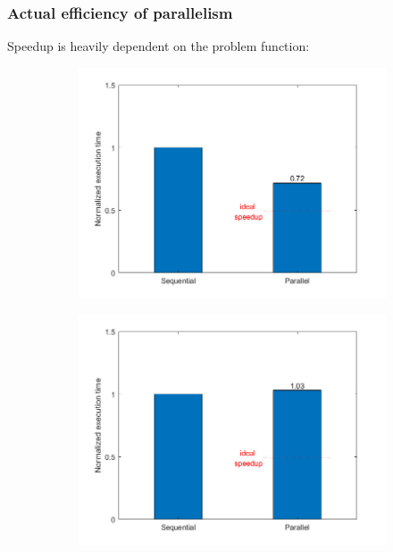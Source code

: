 \documentclass{beamer}
\begin{document}
\begin{frame} %
	\frametitle{Actual efficiency of parallelism}
	Speedup is heavily dependent on the problem function:
	\begin{figure}
		\begin{subfigure}{.333\textwidth}
			\vspace{-6pt}
			\includegraphics[width=\linewidth]{etc/test4_2.jpeg}
		\end{subfigure}%
		\begin{subfigure}{.333\textwidth}
			\includegraphics[width=\linewidth]{etc/test5_2.jpeg}

\end{subfigure}
\end{figure}
\end{frame}
\end{document}
